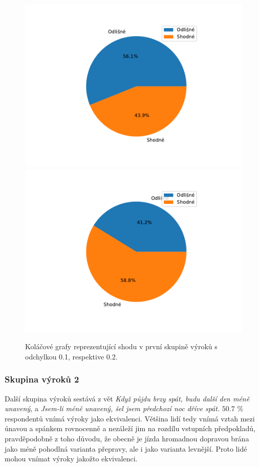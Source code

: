     \begin{figure}[H]
    \caption{Koláčové grafy reprezentující shodu v první skupině výrok\r u s odchylkou 0.1, respektive 0.2.}
                \includegraphics[scale=0.5]{template-fig/group0.pdf}
                \includegraphics[scale=0.5]{template-fig/group00.pdf}
            \end{figure}

\subsubsection{Skupina výrok\r u 2}
Další skupina výrok\r u sestává z vět \textit{\clqq Když půjdu brzy spát, budu další den méně unavený,\crqq } \space a \textit{\clqq Jsem-li méně unavený, šel jsem předchozí noc dříve spát.\crqq } \space  $50.7$ \space $\%$ respondent\r u vnímá výroky jako ekvivalenci. Většina lidí tedy vnímá vztah mezi \' unavou a spánkem rovnocenně a nezáleží jim na rozdílu vstupních předpoklad\r u, pravděpodobně z toho d\r uvodu, že obecně je jízda hromadnou dopravou brána jako méně pohodlná varianta přepravy, ale i jako varianta levnější. Proto lidé mohou vnímat výroky jakožto ekvivalenci.

